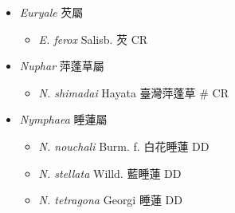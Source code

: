 
  \begin{itemize}
 \item[] \textit{Euryale} 芡屬
                                
  \begin{itemize}
        \item[] \textit{E. ferox} Salisb.  芡   CR
  \end{itemize}
 \item[] \textit{Nuphar} 萍蓬草屬
                                
  \begin{itemize}
        \item[] \textit{N. shimadai} Hayata  臺灣萍蓬草  \# CR
  \end{itemize}
 \item[] \textit{Nymphaea} 睡蓮屬
                                
  \begin{itemize}
        \item[] \textit{N. nouchali} Burm. f.  白花睡蓮   DD
        \item[] \textit{N. stellata} Willd.  藍睡蓮   DD
        \item[] \textit{N. tetragona} Georgi  睡蓮   DD
  \end{itemize}
  \end{itemize}
